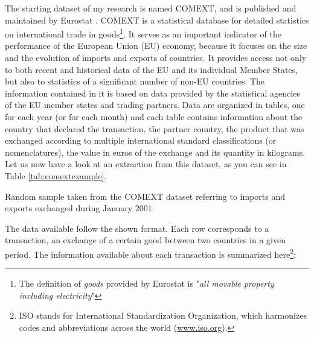 The starting dataset of my research is named COMEXT, and is published and maintained by Eurostat \cite{eurostat2022comext}. COMEXT is a statistical database for detailed statistics on international trade in goods\footnote{The definition of \textit{goods} provided by Eurostat is "\textit{all movable property including electricity}"}. It serves as an important indicator of the performance of the European Union (EU) economy, because it focuses on the size and the evolution of imports and exports of countries. It provides access not only to both recent and historical data of the EU and its individual Member States, but also to statistics of a significant number of non-EU countries. The information contained in it is based on data provided by the statistical agencies of the EU member states and trading partners.
Data are organized in tables, one for each year (or for each month) and each table contains information about the country that declared the transaction, the partner country, the product that was exchanged according to multiple international standard classifications (or nomenclatures), the value in euros of the exchange and its quantity in kilograms.
Let us now have a look at an extraction from this dataset, as you can see in Table \ref{tab:comextexample}.
\begin{landscape}
\begin{table}\label{tab:comextexample}
    \centering
    
    \caption{Random sample taken from the COMEXT dataset referring to imports and exports exchanged during January 2001.}
\end{table}
\end{landscape}
The data available follow the shown format. Each row corresponds to a transaction, an exchange of a certain good between two countries in a given period. The information available about each transaction is summarized here\footnote{ISO stands for International Standardization Organization, which harmonizes codes and abbreviations across the world (\url{www.iso.org}).}:
